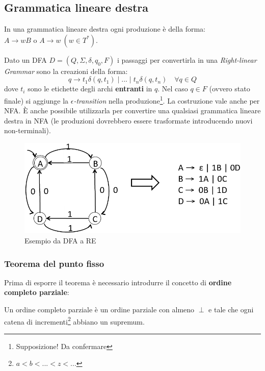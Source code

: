 \subsection{Grammatica lineare destra}
\label{sec:grammatica_lineare_destra}
\begin{definition}
In una grammatica lineare destra ogni produzione \`e della forma:
$A \to wB \text{ o } A \to w \ (w \in T^*)$.
\end{definition}

Dato un DFA $D = (Q,\Sigma, \delta, q_0, F)$ i passaggi per convertirla in una
\textit{Right-linear Grammar} sono la creazioni della forma:
$$q \to t_1\delta(q,t_1) \mid ... \mid t_n\delta(q,t_n) \quad \forall q \in Q$$
dove $t_i$ sono le etichette degli archi \textbf{entranti} in $q$. Nel caso
$q \in F$ (ovvero stato finale) si aggiunge la $\epsilon$\textit{-transition}
nella produzione\footnote{Supposizione! Da confermare}. La costruzione vale
anche per NFA. \`E anche possibile utilizzarla per convertire una qualsiasi
grammatica lineare destra in NFA (le produzioni dovrebbero essere trasformate
introducendo nuovi non-terminali).

\begin{figure}[H]
\begin{center}
\includegraphics[scale=0.5]{res/image/from_dfa_to_re}
\end{center}
\caption{Esempio da DFA a RE}
\label{img:from_dfa_to_re}
\end{figure}

\subsubsection{Teorema del punto fisso}
\label{sec:theorem_fixed_point}
Prima di esporre il teorema \`e necessario introdurre il concetto di
\textbf{ordine completo parziale}:
\begin{definition}
Un ordine completo parziale \`e un ordine parziale con almeno $\perp$ e tale
che ogni catena di incrementi\footnote{$a < b < ... < z < ...$} abbiano un
supremum.
\end{definition}

